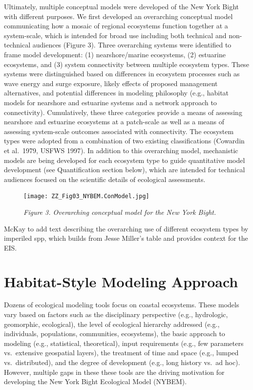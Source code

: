\documentclass[
]{book}
\begin{document}
Ultimately, multiple conceptual models were developed of the New York Bight with different purposes. We first developed an overarching conceptual model communicating how a mosaic of regional ecosystems function together at a system-scale, which is intended for broad use including both technical and non-technical audiences (Figure 3). Three overarching systems were identified to frame model development: (1) nearshore/marine ecosystems, (2) estuarine ecosystems, and (3) system connectivity between multiple ecosystem types. These systems were distinguished based on differences in ecosystem processes such as wave energy and surge exposure, likely effects of proposed management alternatives, and potential differences in modeling philosophy (e.g., habitat models for nearshore and estuarine systems and a network approach to connectivity). Cumulatively, these three categories provide a means of assessing nearshore and estuarine ecosystems at a patch-scale as well as a means of assessing system-scale outcomes associated with connectivity. The ecosystem types were adopted from a combination of two existing classifications (Cowardin et al.~1979, USFWS 1997). In addition to this overarching model, mechanistic models are being developed for each ecosystem type to guide quantitative model development (see Quantification section below), which are intended for technical audiences focused on the scientific details of ecological assessments.

\begin{figure}
\centering
\texttt{[image: ZZ\_Fig03\_NYBEM.ConModel.jpg]}
\caption{\emph{Figure 3. Overarching conceptual model for the New York Bight.}}
\end{figure}

{McKay to add text describing the overarching use of different ecosystem types by imperiled spp, which builds from Jesse Miller's table and provides context for the EIS.}

\hypertarget{habitat-style-modeling-approach}{%
\section{Habitat-Style Modeling Approach}\label{habitat-style-modeling-approach}}

Dozens of ecological modeling tools focus on coastal ecosystems. These models vary based on factors such as the disciplinary perspective (e.g., hydrologic, geomorphic, ecological), the level of ecological hierarchy addressed (e.g., individuals, populations, communities, ecosystems), the basic approach to modeling (e.g., statistical, theoretical), input requirements (e.g., few parameters vs.~extensive geospatial layers), the treatment of time and space (e.g., lumped vs.~distributed), and the degree of development (e.g., long history vs.~ad hoc). However, multiple gaps in these these tools are the driving motivation for developing the New York Bight Ecological Model (NYBEM).
\end{document}
